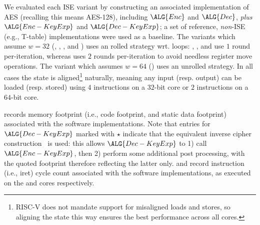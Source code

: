 
We evaluated each ISE variant by constructing an associated implementation
of AES (recalling this means AES-128), including
$\ALG{Enc}$
and
$\ALG{Dec}$,
{\em plus}
$\ALG{Enc-KeyExp}$
and
$\ALG{Dec-KeyExp}$;
a set of reference, {\em non}-ISE 
(e.g., T-table) 
implementations were used as a baseline.
The variants which assume  $w = 32$
(, ,     , and )
uses an   rolled strategy wrt. loops:
 , ,              and 
use  $1$ round  per-iteration,
whereas
uses $2$ rounds per-iteration
to avoid needless register move operations.
The variant  which assumes $w = 64$
()
uses an unrolled strategy.
In all cases the state is aligned\footnote{%
RISC-V does not mandate support for misaligned loads and stores, so
aligning the state this way ensures the best performance across all
cores.
} naturally, meaning any input (resp. output) can be loaded (resp. stored) 
using 
$4$  instructions on a $32$-bit core
or
$2$  instructions on a $64$-bit core.

records
memory footprint (i.e., code footprint, and static data footprint)
associated with the software implementations.
Note that entries for $\ALG{Dec-KeyExp}$ marked with $\star$ indicate that 
the equivalent inverse cipher construction~ \cite[Section 5.3.5]{FIPS:197}
is used: this allows $\ALG{Dec-KeyExp}$ to
1) call $\ALG{Enc-KeyExp}$,
   then
2) perform some additional post processing,
with the quoted footprint therefore reflecting the latter only.
and
record
instruction (i.e., iret) cycle count
associated with the software implementations,
as executed on the  and  cores respectively.


